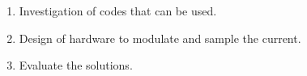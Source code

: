\documentclass{beamer}
\begin{document}
\begin{frame}
\begin{enumerate}
				\item Investigation of codes that can be used.

				\item Design of hardware to modulate and sample the current.

				\item Evaluate the solutions.

		\end{enumerate}

		

		




	\end{frame}





\end{document}
